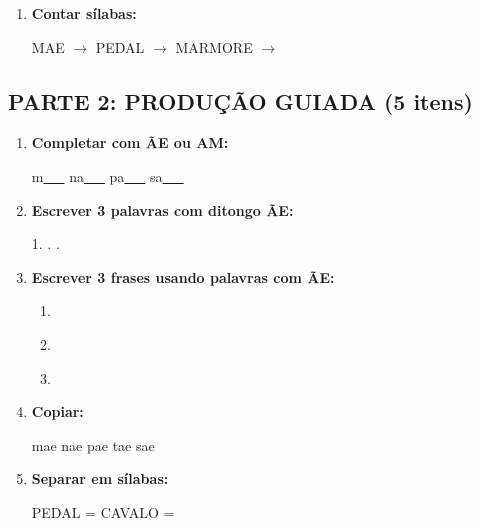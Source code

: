 \begin{exercicio}
\begin{enumerate}
  \item \textbf{Contar sílabas:}
  \begin{center}
  MAE $\rightarrow$ \underline{\hspace{1cm}} \quad PEDAL $\rightarrow$ \underline{\hspace{1cm}} \quad MARMORE $\rightarrow$ \underline{\hspace{1cm}}
  \end{center}
\end{enumerate}

\subsection*{PARTE 2: PRODUÇÃO GUIADA (5 itens)}

\begin{enumerate}[resume]
  \item \textbf{Completar com \~AE ou AM:}
  \begin{center}
  m\underline{~~~} \quad na\underline{~~~} \quad pa\underline{~~~} \quad sa\underline{~~~}
  \end{center}

  \item \textbf{Escrever 3 palavras com ditongo \~AE:}
  \begin{center}
  1. \underline{\hspace{3cm}} . \underline{\hspace{3cm}} . \underline{\hspace{3cm}}
  \end{center}

  \item \textbf{Escrever 3 frases usando palavras com \~AE:}
  \begin{enumerate}[label=\alph*)]
    \item \underline{\hspace{8cm}}
    \item \underline{\hspace{8cm}}
    \item \underline{\hspace{8cm}}
  \end{enumerate}

  \item \textbf{Copiar:}
  \begin{center}
  mae \quad nae \quad pae \quad tae \quad sae
  \end{center}

  \item \textbf{Separar em sílabas:}
  \begin{center}
  PEDAL = \underline{\hspace{1cm}} \underline{\hspace{1cm}} \quad CAVALO = \underline{\hspace{1cm}} \underline{\hspace{1cm}} \underline{\hspace{1cm}}
  \end{center}
\end{enumerate}


\end{exercicio}

